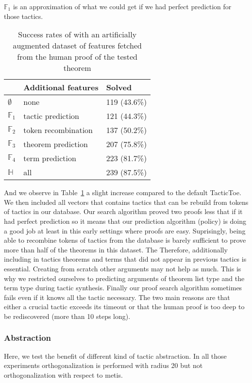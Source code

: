 \documentclass[runningheads,a4paper,draft]{svjour3}
\def\tactictoe{\textsf{TacticToe}\xspace}
\newcommand{\ra}[1]{\renewcommand{\arraystretch}{#1}}
\begin{document}
$\mathbb{F}_1$ is an approximation of what we could get if we had perfect 
prediction for those tactics.


\begin{table}[h]
\centering\ra{1.3}
\small
\begin{tabular}{lll}
\toprule
 & Additional features & Solved \\
\midrule
$\emptyset$ & none & 119 (43.6\%) \\ %
$\mathbb{F}_1$& tactic prediction & 121 (44.3\%) \\ %
$\mathbb{F}_2$& token recombination  & 137 (50.2\%) \\ %
$\mathbb{F}_3$& theorem prediction  & 207 (75.8\%) \\ %
$\mathbb{F}_4$& term prediction & 223 (81.7\%) \\ %
$\mathbb{H}$     & all & 239 (87.5\%) \\ %
\bottomrule
\end{tabular}
\caption{\label{tab:featue_param} Success rates of with an artificially 
augmented dataset of features fetched from the human proof of the tested 
theorem}
\end{table}

And we observe in Table~\ref{tab:featue_param} a 
slight increase compared to the default \tactictoe. We then included all 
vectors that contains tactics that can be rebuild from tokens of
tactics in our database. 
Our search algorithm proved two proofs less that if it had perfect prediction 
so it means that our prediction algorithm (policy) is doing a good  job at 
least in this early settings where proofs are easy. 
Suprisingly, being able to recombine tokens of tactics from the database is 
barely sufficient to prove more than half of the theorems in this dataset. The 
Therefore, additionally including in tactics theorems and terms that did not 
appear in previous tactics is essential. Creating from scratch other arguments 
may not help as much. This is why we restricted ourselves to predicting 
arguments of theorem list type and the term type during tactic synthesis. 
Finally our proof search algorithm sometimes fails even if it knows all the 
tactic necessary. The two main reasons are that either a crucial tactic exceeds 
its timeout or that the human proof is too deep to be rediscovered (more than 
10 steps long).

\subsubsection{Abstraction}
Here, we test the benefit of different kind of tactic abstraction. 
In all those experiments orthogonalization is performed with radius 20 but not 
orthogonalization with respect to metis.
\end{document}
